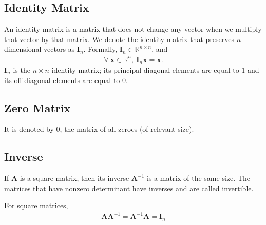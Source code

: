 \subsection{Identity Matrix}

An identity matrix is a matrix that does not change any vector when we multiply that vector by that matrix. We denote the identity matrix that preserves \(n\)-dimensional vectors as \(\mathbf{I}_{n}\). Formally, \(\mathbf{I}_{n} \in \mathbb{R}^{n \times n}\), and
\begin{align}
\forall \ \mathbf{x} \in \mathbb{R}^{n}, \ \mathbf{I}_{n} \mathbf{x} = \mathbf{x}.
\end{align}
\(\mathbf{I}_{n}\) is the \(n \times n\) identity matrix; its principal diagonal elements are equal to \(1\) and its off-diagonal elements are equal to \(0\).

\subsection{Zero Matrix}

It is denoted by \(0\), the matrix of all zeroes (of relevant size).

\subsection{Inverse}

If \(\mathbf{A}\) is a square matrix, then its inverse \(\mathbf{A}^{-1}\) is a matrix of the same size. The matrices that have nonzero determinant have inverses and are called invertible.

For square matrices,
\begin{align}
\mathbf{A} \mathbf{A}^{-1} = \mathbf{A}^{-1} \mathbf{A} = \mathbf{I}_{n}
\end{align}

